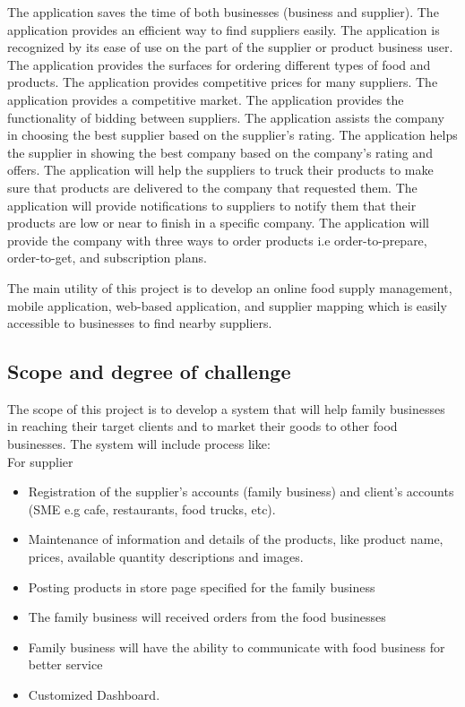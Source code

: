\documentclass[11pt]{article}
\newcommand\tab[1][1cm]{\hspace*{#1}}
\begin{document}
	The application saves the time of both businesses (business and supplier). The application provides an efficient way to find suppliers easily. The application is recognized by its ease of use on the part of the supplier or product business user. The application provides the surfaces for ordering different types of food and products. The application provides competitive prices for many suppliers. The application provides a competitive market. The application provides the functionality of bidding between suppliers. The application assists the company in choosing the best supplier based on the supplier's rating. The application helps the supplier in showing the best company based on the company’s rating and offers. The application will help the suppliers to truck their products to make sure that products are delivered to the company that requested them. The application will provide notifications to suppliers to notify them that their products are low or near to finish in a specific company. The application will provide the company with three ways to order products i.e order-to-prepare, order-to-get, and subscription plans.


   The main utility of this project is to develop an online food supply management, mobile application, web-based application, and supplier mapping which is easily accessible to businesses to find nearby suppliers. 

\subsection{Scope and degree of challenge}

\tab The scope of this project is to develop a system that will help family businesses in reaching their target clients and to market their goods to other food businesses. The system will include process like: \\

For supplier 

\begin{itemize}


\item Registration of the supplier’s accounts (family business) and client’s accounts (SME e.g cafe,  restaurants, food trucks, etc).
\item Maintenance of information and details of the products, like product name, prices, available quantity descriptions and images. 
\item Posting products in store page specified for the family business 
\item The family business will received orders from the food businesses
\item Family business will have the ability to communicate with food business for better service 
\item Customized Dashboard.
\end{itemize}
\end{document}

